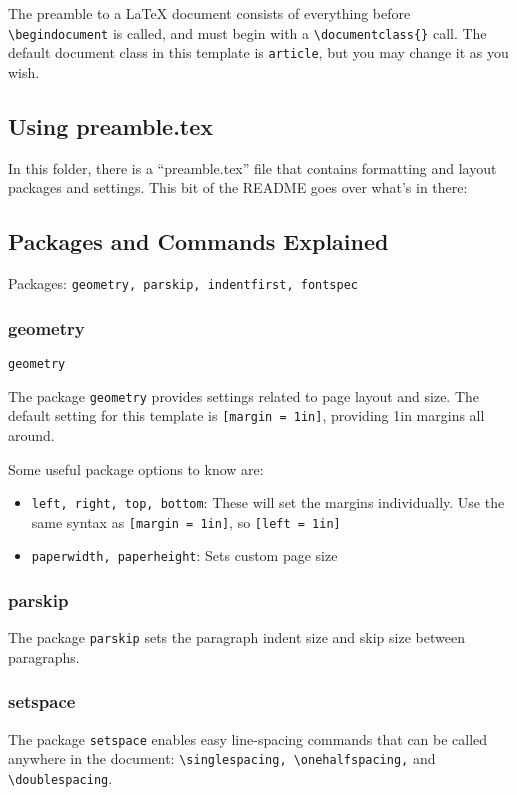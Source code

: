 \documentclass[12pt]{article}
\begin{document}
The preamble to a LaTeX document consists of everything before \texttt{\textbackslash begin{document}} is called, and must begin with a \texttt{\textbackslash documentclass\{\}} call. The default document class in this template is \texttt{article}, but you may change it as you wish.

\subsection{Using preamble.tex}

In this folder, there is a ``preamble.tex'' file that contains formatting and layout packages and settings. This bit of the README goes over what's in there: 


\subsection{Packages and Commands Explained}

Packages: \texttt{geometry, parskip, indentfirst, fontspec}

\subsubsection{geometry} \texttt{geometry}

    The package \texttt{geometry} provides settings related to page layout and size. The default setting for this template is \texttt{[margin = 1in]}, providing 1in margins all around. 

    Some useful package options to know are: 

    \begin{itemize}
        \item \texttt{left, right, top, bottom}: These will set the margins individually. Use the same syntax as \texttt{[margin = 1in]}, so \texttt{[left = 1in]}
        \item \texttt{paperwidth, paperheight}: Sets custom page size
    \end{itemize}

\subsubsection{parskip}

    The package \texttt{parskip} sets the paragraph indent size and skip size between paragraphs. 

\subsubsection{setspace}
    The package \texttt{setspace} enables easy line-spacing commands that can be called anywhere in the document: \texttt{\textbackslash singlespacing, \textbackslash onehalfspacing,} and \texttt{\textbackslash doublespacing}. 
\end{document}
